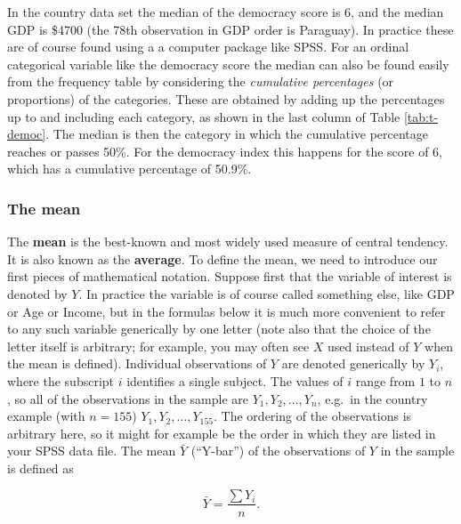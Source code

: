 \documentclass[11pt,a4paper,openany]{book}
\begin{document}
In the country data set the median of the democracy score is 6, and the
median GDP is \$4700 (the 78th observation in GDP order is Paraguay). In
practice these are of course found using a a computer package like SPSS.
For an ordinal categorical variable like the democracy score the median
can also be found easily from the frequency table by considering the
\emph{cumulative percentages} (or proportions) of the categories. These
are obtained by adding up the percentages up to and including each
category, as shown in the last column of Table \ref{tab:t-democ}. The
median is then the category in which the cumulative percentage reaches
or passes 50\%. For the democracy index this happens for the score of 6,
which has a cumulative percentage of 50.9\%.

\subsubsection*{The mean}\label{the-mean}

The \textbf{mean} is the best-known and most widely used measure of
central tendency. It is also known as the \textbf{average}. To define
the mean, we need to introduce our first pieces of mathematical
notation. Suppose first that the variable of interest is denoted by
\(Y\). In practice the variable is of course called something else, like
GDP or Age or Income, but in the formulas below it is much more
convenient to refer to any such variable generically by one letter (note
also that the choice of the letter itself is arbitrary; for example, you
may often see \(X\) used instead of \(Y\) when the mean is defined).
Individual observations of \(Y\) are denoted generically by \(Y_{i}\),
where the subscript \(i\) identifies a single subject. The values of
\(i\) range from \(1\) to \(n\), so all of the observations in the
sample are \(Y_{1}, Y_{2}, \dots, Y_{n}\), e.g.~in the country example
(with \(n=155\)) \(Y_{1}, Y_{2}, \dots, Y_{155}\). The ordering of the
observations is arbitrary here, so it might for example be the order in
which they are listed in your SPSS data file. The mean \(\bar{Y}\)
(``Y-bar'') of the observations of \(Y\) in the sample is defined as

\begin{equation}\bar{Y} = \frac{\sum Y_{i}}{n}.
\label{eq:Ybar}\end{equation}
\end{document}
